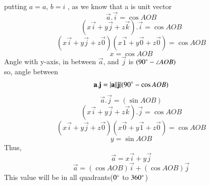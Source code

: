 \documentclass[journal,12pt,twocolumn]{IEEEtran}
\begin{document}
%
putting $a=a$, $b=i$ , as we know that a is unit vector
\begin{equation}
    \vec{a}.\vec{i} = \cos{AOB}
\end{equation}
%
\begin{equation}
 (x\vec{i}+y\vec{j}+z\vec{k}).\vec{i} = \cos{AOB} 
\end{equation}
%
\begin{equation}
 (x\vec{i}+y\vec{j}+z\vec{0})(x\vec{1}+y\vec{0}+z\vec{0}) = \cos{AOB} 
\end{equation}
%
\begin{equation}
x= \cos{AOB}
\end{equation}
%
Angle with y-axis, in between $\vec{a}$,  and  $\vec{j}$  is $(90\degree - \angle{AOB})$\\
%
so, angle between \\
%
\begin{equation}
\mathbf{a}.\mathbf{j} = |\mathbf{a}| |\mathbf{j}| (90\degree -\cos{AOB})
\end{equation}
%
\begin{equation}
\vec{a}.\vec{j} = (\sin{AOB})
\end{equation}
%
\begin{equation}
 (x\vec{i}+y\vec{j}+z\vec{k}).\vec{j} = \cos{AOB} 
\end{equation}
%
\begin{equation}
 (x\vec{i}+y\vec{j}+z\vec{0})(x\vec{0}+y\vec{1}+z\vec{0}) = \cos{AOB} 
\end{equation}
%
\begin{equation}
y= \sin{AOB}
\end{equation}
%
Thus,
%
\begin{equation}
\vec{a} = x\vec{i}+y\vec{j}
\end{equation}
%
\begin{equation}
\vec{a} = (\cos{AOB})\vec{i}+(\cos{AOB}) \vec{j}
\end{equation}
%
This value will be in all quadrants($0\degree$ to $360\degree$)
\\
\end{document}
